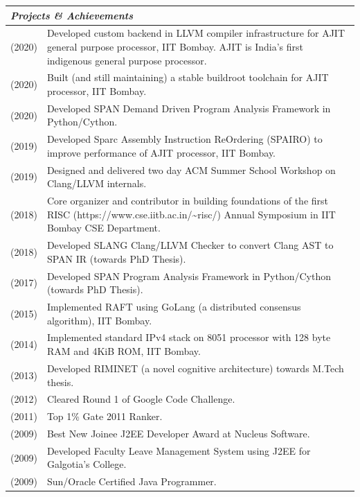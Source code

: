 \documentclass[a4paper,12pt]{article}
\newcommand{\Heading}[1]{\textbf{\itshape\normalsize #1}}
\begin{document}
\begin{flushleft}
\vspace{1em}
\begin{tabular}{ m{} m{}}
\multicolumn{2}{l}{\Heading{Projects \& Achievements}} \\
    \hline
    \hline
\rule[13pt]{0ex}{0ex}(2020) & Developed custom backend in LLVM compiler infrastructure
for AJIT general purpose processor, IIT Bombay. AJIT is India's first indigenous general purpose processor. \\
\rule[13pt]{0ex}{0ex}(2020) & Built (and still maintaining) a stable buildroot toolchain
for AJIT processor, IIT Bombay. \\
\rule[13pt]{0ex}{0ex}(2020) & Developed SPAN Demand Driven Program Analysis Framework in Python/Cython. \\
\rule[13pt]{0ex}{0ex}(2019) & Developed Sparc Assembly Instruction ReOrdering (SPAIRO)
to improve performance of AJIT processor, IIT Bombay. \\
\rule[13pt]{0ex}{0ex}(2019) & Designed and delivered two day ACM Summer School Workshop on Clang/LLVM internals.\\
\rule[13pt]{0ex}{0ex}(2018) & Core organizer and contributor in building foundations of the first RISC (https://www.cse.iitb.ac.in/\textasciitilde{}risc/) Annual Symposium in IIT Bombay CSE Department. \\
\rule[13pt]{0ex}{0ex}(2018) & Developed SLANG Clang/LLVM Checker to convert Clang AST to SPAN IR (towards PhD Thesis). \\
\rule[13pt]{0ex}{0ex}(2017) & Developed SPAN Program Analysis Framework in Python/Cython (towards PhD Thesis). \\
\rule[13pt]{0ex}{0ex}(2015) & Implemented RAFT using GoLang (a distributed consensus algorithm), IIT Bombay. \\
\rule[13pt]{0ex}{0ex}(2014) & Implemented standard IPv4 stack on 8051 processor with 128 byte RAM and 4KiB ROM, IIT Bombay. \\
\rule[13pt]{0ex}{0ex}(2013) & Developed RIMINET (a novel cognitive architecture) towards M.Tech thesis. \\
\rule[13pt]{0ex}{0ex}(2012) & Cleared Round 1 of Google Code Challenge. \\
\rule[13pt]{0ex}{0ex}(2011) & Top 1\% Gate 2011 Ranker. \\
\rule[13pt]{0ex}{0ex}(2009) & Best New Joinee J2EE Developer Award at Nucleus Software. \\
\rule[13pt]{0ex}{0ex}(2009) & Developed Faculty Leave Management System using J2EE for Galgotia's College.\\
\rule[13pt]{0ex}{0ex}(2009) & Sun/Oracle Certified Java Programmer. \\
\end{tabular}


\end{flushleft}
\end{document}
